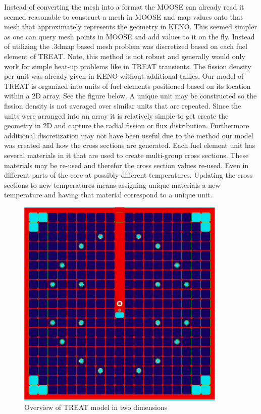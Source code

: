 \documentclass[11pt]{article}
\begin{document}
Instead of converting the mesh into a format the MOOSE can already read it seemed reasonable to construct a mesh in MOOSE and map values onto that mesh that approximately represents the geometry in KENO.  This seemed simpler as one can query mesh points in MOOSE and add values to it on the fly.  Instead of utilizing the .3dmap based mesh problem was discretized based on each fuel element of TREAT.  Note, this method is not robust and generally would only work for simple heat-up problems like in TREAT transients.  The fission density per unit was already given in KENO without additional tallies.  Our model of TREAT is organized into units of fuel elements positioned based on its location within a 2D array. See the figure below.  A unique unit may be constructed so the fission density is not averaged over similar units that are repeated.  Since the units were arranged into an array it is relatively simple to get create the geometry in 2D and capture the radial fission or flux distribution.  Furthermore additional discretization may not have been useful due to the method our model was created and how the cross sections are generated.  Each fuel element unit has several materials in it that are used to create multi-group cross sections. These materials may be re-used and therefor the cross section values re-used.  Even in different parts of the core at possibly different temperatures.  Updating the cross sections to new temperatures means assigning unique materials a new temperature and having that material correspond to a unique unit.  

\begin{figure}
    \centering
    \includegraphics[width=10cm]{figures/treat_top_view.png}
    \caption{Overview of TREAT model in two dimensions}
    \label{fig:treat2d}
\end{figure}
\end{document}

